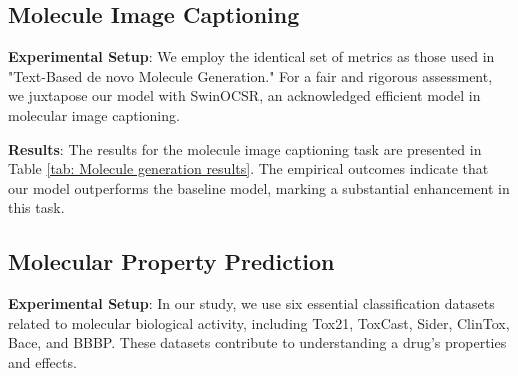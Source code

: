 \documentclass{article}
\begin{document}
\subsection{Molecule Image Captioning}
\textbf{Experimental Setup}: We employ the identical set of metrics as those used in "Text-Based de novo Molecule Generation." For a fair and rigorous assessment, we juxtapose our model with SwinOCSR, an acknowledged efficient model in molecular image captioning.
 
\textbf{Results}: The results for the molecule image captioning task are presented in Table \ref{tab: Molecule generation results}. The empirical outcomes indicate that our model outperforms the baseline model, marking a substantial enhancement in this task.

\subsection{Molecular Property Prediction}

\textbf{Experimental Setup}: In our study, we use six essential classification datasets related to molecular biological activity, including Tox21, ToxCast, Sider, ClinTox, Bace, and BBBP. These datasets contribute to understanding a drug's properties and effects.
\end{document}

